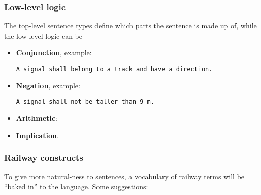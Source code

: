\documentclass[]{article}
\begin{document}
\subsubsection{Low-level logic}\label{low-level-logic}

The top-level sentence types define which parts the sentence is made up
of, while the low-level logic can be

\begin{itemize}
\item
  \textbf{Conjunction}, example:

\begin{verbatim}
A signal shall belong to a track and have a direction.
\end{verbatim}
\item
  \textbf{Negation}, example:

\begin{verbatim}
A signal shall not be taller than 9 m.
\end{verbatim}
\item
  \textbf{Arithmetic}:
\item
  \textbf{Implication}.
\end{itemize}

\subsubsection{Railway constructs}\label{railway-constructs}

To give more natural-ness to sentences, a vocabulary of railway terms
will be ``baked in'' to the language. Some suggestions:
\end{document}
